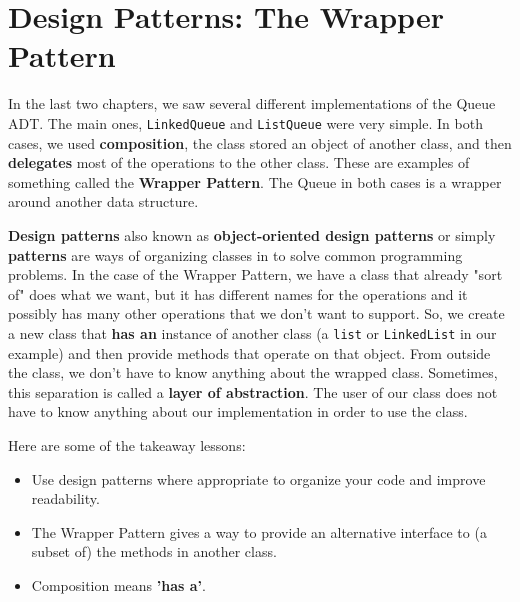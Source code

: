 \section{Design Patterns:  The Wrapper Pattern}


In the last two chapters, we saw several different implementations of the Queue ADT.
The main ones, \texttt{LinkedQueue} and \texttt{ListQueue} were very simple.
In both cases, we used \textbf{composition}, the class stored an object of another class, and then \textbf{delegates} most of the operations to the other class.
These are examples of something called the \textbf{Wrapper Pattern}.
The Queue in both cases is a wrapper around another data structure.


\textbf{Design patterns} also known as \textbf{object-oriented design patterns} or simply \textbf{patterns} are ways of organizing classes in to solve common programming problems.
In the case of the Wrapper Pattern, we have a class that already "sort of" does what we want, but it has different names for the operations and it possibly has many other operations that we don't want to support.
So, we create a new class that \textbf{has an} instance of another class (a \texttt{list} or \texttt{LinkedList} in our example) and then provide methods that operate on that object.
From outside the class, we don't have to know anything about the wrapped class.
Sometimes, this separation is called a \textbf{layer of abstraction}.
The user of our class does not have to know anything about our implementation in order to use the class.


Here are some of the takeaway lessons:

\begin{itemize}

\item Use design patterns where appropriate to organize your code and improve readability.

\item The Wrapper Pattern gives a way to provide an alternative interface to (a subset of) the methods in another class.

\item Composition means \textbf{'has a'}.

\end{itemize}